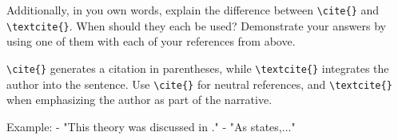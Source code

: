 \documentclass[10pt,twocolumn]{article}
\begin{document}
Additionally, in you own words, explain the difference between \texttt{{\textbackslash}cite\{\}} and \texttt{{\textbackslash}textcite\{\}}. When should they each be used? Demonstrate your answers by using one of them with each of your references from above.

\texttt{{\textbackslash}cite\{\}} generates a citation in parentheses, while \texttt{{\textbackslash}textcite\{\}} integrates the author into the sentence. Use \texttt{{\textbackslash}cite\{\}} for neutral references, and \texttt{{\textbackslash}textcite\{\}} when emphasizing the author as part of the narrative. 

Example:
- "This theory was discussed in \cite{Samuelson2016}."
- "As \textcite{Hemingway1952} states,..."

\cite{Samuelson2016}
\cite{Herman2005}
\cite{Zhang2020}
\cite{NYT2025}
\cite{Owen2013}
\cite{Hemingway1952}
\cite{GolfDigest2023}
\cite{PythonDocs2021}

\printbibliography
\end{document}
